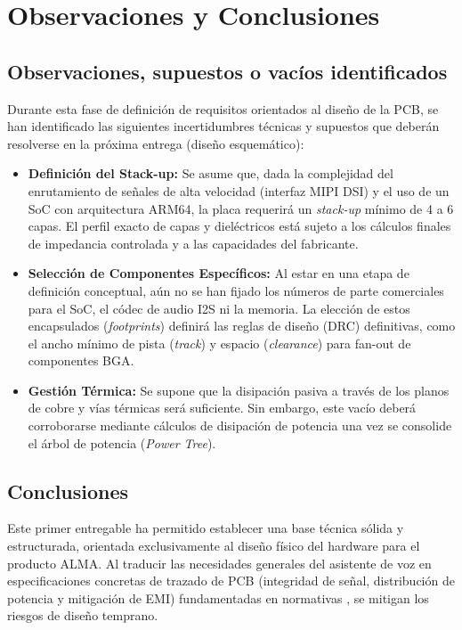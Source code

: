 \documentclass[%
	paper=a4,				%
	twoside=false,				%
	parskip=half,				%
	chapterprefix=false, 		%
	10pt,						%
	headings=normal,			%
	bibliography=totoc,			%
	listof=totoc,				%
	titlepage=on,				%
	captions=tableabove,		%
	draft=false,				%
]{scrbook}%
\begin{document}
\chapter{Observaciones y Conclusiones}

\section{Observaciones, supuestos o vacíos identificados}
Durante esta fase de definición de requisitos orientados al diseño de la PCB, se han identificado las siguientes incertidumbres técnicas y supuestos que deberán resolverse en la próxima entrega (diseño esquemático):
\begin{itemize}
    \item \textbf{Definición del Stack-up:} Se asume que, dada la complejidad del enrutamiento de señales de alta velocidad (interfaz MIPI DSI) y el uso de un SoC con arquitectura ARM64, la placa requerirá un \textit{stack-up} mínimo de 4 a 6 capas. El perfil exacto de capas y dieléctricos está sujeto a los cálculos finales de impedancia controlada y a las capacidades del fabricante.
    \item \textbf{Selección de Componentes Específicos:} Al estar en una etapa de definición conceptual, aún no se han fijado los números de parte comerciales para el SoC, el códec de audio I2S ni la memoria. La elección de estos encapsulados (\textit{footprints}) definirá las reglas de diseño (DRC) definitivas, como el ancho mínimo de pista (\textit{track}) y espacio (\textit{clearance}) para fan-out de componentes BGA.
    \item \textbf{Gestión Térmica:} Se supone que la disipación pasiva a través de los planos de cobre y vías térmicas será suficiente. Sin embargo, este vacío deberá corroborarse mediante cálculos de disipación de potencia una vez se consolide el árbol de potencia (\textit{Power Tree}).
\end{itemize}

\section{Conclusiones}
Este primer entregable ha permitido establecer una base técnica sólida y estructurada, orientada exclusivamente al diseño físico del hardware para el producto ALMA. Al traducir las necesidades generales del asistente de voz en especificaciones concretas de trazado de PCB (integridad de señal, distribución de potencia y mitigación de EMI) fundamentadas en normativas \cite{iec62368}, se mitigan los riesgos de diseño temprano.
\end{document}
